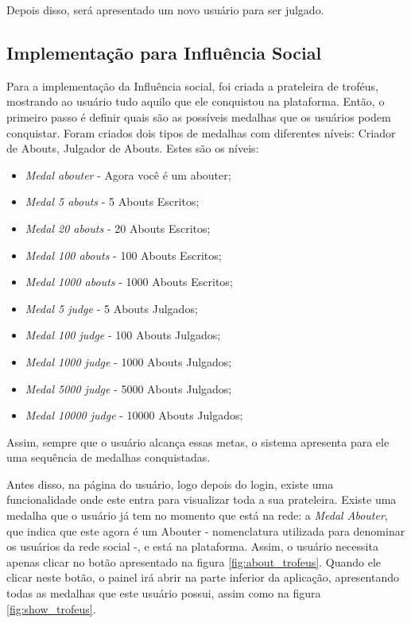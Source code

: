 Depois disso, será apresentado um novo usuário para ser julgado.

\subsection{Implementação para Influência Social}
\label{sub:implementacao_influencia_social}
Para a implementação da Influência social, foi criada a prateleira de troféus, mostrando
ao usuário tudo aquilo que ele conquistou na plataforma. Então, o primeiro passo é definir quais são
as possíveis medalhas que os usuários podem conquistar. Foram criados dois tipos de medalhas com diferentes
níveis: Criador de Abouts, Julgador de Abouts. Estes são os níveis:

\begin{itemize}
    \item \textit{Medal abouter} - Agora você é um abouter;
    \item \textit{Medal 5 abouts} - 5 Abouts Escritos;
    \item \textit{Medal 20 abouts} - 20 Abouts Escritos;
    \item \textit{Medal 100 abouts} - 100 Abouts Escritos;
    \item \textit{Medal 1000 abouts} - 1000 Abouts Escritos;
    \item \textit{Medal 5 judge} - 5 Abouts Julgados;
    \item \textit{Medal 100 judge} - 100 Abouts Julgados;
    \item \textit{Medal 1000 judge} - 1000 Abouts Julgados;
    \item \textit{Medal 5000 judge} - 5000 Abouts Julgados;
    \item \textit{Medal 10000 judge} - 10000 Abouts Julgados;
\end{itemize}

Assim, sempre que o usuário alcança essas metas, o sistema apresenta para ele uma sequência de medalhas
conquistadas.

Antes disso, na página do usuário, logo depois do login, existe uma funcionalidade onde este entra para visualizar toda a sua prateleira.
Existe uma medalha que o usuário já tem no momento que está na rede: a \textit{Medal Abouter},
que indica que este agora é um Abouter - nomenclatura utilizada para denominar os usuários da rede social -,
e está na plataforma.
Assim, o usuário necessita apenas clicar no botão apresentado na figura \ref{fig:about_trofeus}.
Quando ele clicar neste botão, o painel irá abrir na parte inferior da aplicação, apresentando todas
as medalhas que este usuário possui, assim como na figura \ref{fig:show_trofeus}.

